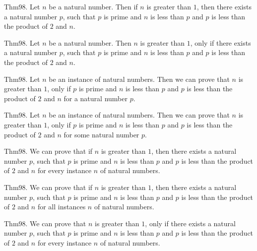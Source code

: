 \documentclass{article}
\begin{document}
Thm98. Let $n$ be a natural number. Then if $n$ is greater than $1$, then there exists a natural number $p$, such that $p$ is prime and $n$ is less than $p$ and $p$ is less than the product of $2$ and $n$.

Thm98. Let $n$ be a natural number. Then $n$ is greater than $1$, only if there exists a natural number $p$, such that $p$ is prime and $n$ is less than $p$ and $p$ is less than the product of $2$ and $n$.

Thm98. Let $n$ be an instance of natural numbers. Then we can prove that $n$ is greater than $1$, only if $p$ is prime and $n$ is less than $p$ and $p$ is less than the product of $2$ and $n$ for a natural number $p$.

Thm98. Let $n$ be an instance of natural numbers. Then we can prove that $n$ is greater than $1$, only if $p$ is prime and $n$ is less than $p$ and $p$ is less than the product of $2$ and $n$ for some natural number $p$.

Thm98. We can prove that if $n$ is greater than $1$, then there exists a natural number $p$, such that $p$ is prime and $n$ is less than $p$ and $p$ is less than the product of $2$ and $n$ for every instance $n$ of natural numbers.

Thm98. We can prove that if $n$ is greater than $1$, then there exists a natural number $p$, such that $p$ is prime and $n$ is less than $p$ and $p$ is less than the product of $2$ and $n$ for all instances $n$ of natural numbers.

Thm98. We can prove that $n$ is greater than $1$, only if there exists a natural number $p$, such that $p$ is prime and $n$ is less than $p$ and $p$ is less than the product of $2$ and $n$ for every instance $n$ of natural numbers.
\end{document}
